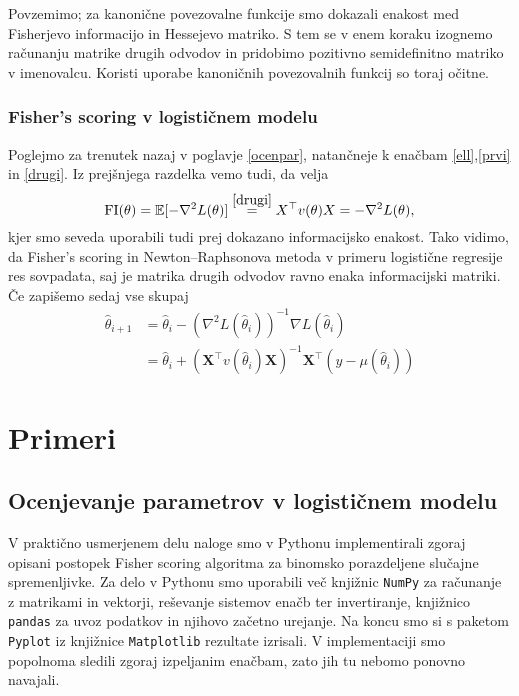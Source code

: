 \documentclass[12pt,a4paper]{amsart}
\theoremstyle{definition} %
\theoremstyle{plain} %
\begin{document}
Povzemimo; za kanonične povezovalne funkcije smo dokazali enakost med Fisherjevo informacijo in Hessejevo matriko. S tem se v enem koraku izognemo računanju matrike drugih 
odvodov in pridobimo pozitivno semidefinitno matriko v imenovalcu. Koristi uporabe kanoničnih povezovalnih funkcij so toraj očitne.

\subsubsection{Fisher's scoring v logističnem modelu}
Poglejmo za trenutek nazaj v poglavje \ref{ocenpar}, natančneje k enačbam \eqref{ell},\eqref{prvi} in \eqref{drugi}. Iz prejšnjega razdelka vemo tudi, da velja
\[
    \mathrm{FI}(\theta) = \mathbb{E}[-\nabla ^2 L(\theta)] \overset{\eqref{drugi}}{=} X^\top v(\theta)X = -\nabla ^2 L(\theta),
\]
kjer smo seveda uporabili tudi prej dokazano informacijsko enakost. Tako vidimo, da Fisher's scoring in Newton--Raphsonova metoda v primeru logistične regresije
res sovpadata, saj je matrika drugih odvodov ravno enaka informacijski matriki. Če zapišemo sedaj vse skupaj
\begin{align}
    \hat{\theta}_{i+1} &= \hat{\theta}_{i} - (\nabla^{2} L(\hat{\theta}_{i}))^{-1} \nabla L(\hat{\theta}_{i}) \nonumber \\
    &= \hat{\theta}_{i} + (\mathbf{X}^\top v(\hat{\theta}_{i}) \mathbf{X})^{-1}\mathbf{X}^\top(y - \mu(\hat{\theta}_{i})) 
\end{align}

\section{Primeri}
\subsection{Ocenjevanje parametrov v logističnem modelu}

V praktično usmerjenem delu naloge smo v Pythonu implementirali zgoraj opisani postopek Fisher scoring algoritma za binomsko porazdeljene slučajne
spremenljivke. Za delo v Pythonu smo uporabili več knjižnic\; \texttt{NumPy} za računanje z matrikami in vektorji, reševanje sistemov enačb ter invertiranje,
knjižnico \texttt{pandas} za uvoz podatkov in njihovo začetno urejanje. Na koncu smo si s paketom \texttt{Pyplot} iz knjižnice \texttt{Matplotlib} rezultate izrisali.
V implementaciji smo popolnoma sledili zgoraj izpeljanim enačbam, zato jih tu nebomo ponovno navajali.
\end{document}

